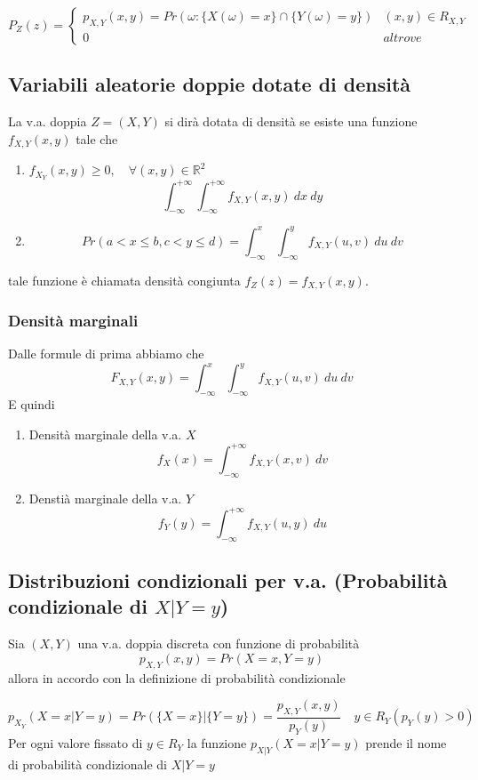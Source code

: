 \documentclass[a4paper]{report}
\begin{document}
  \[
    P_Z(z) =
    \begin{cases}
      p_{X,Y}(x,y) = Pr(\omega : \{ X(\omega) = x \} \cap \{ Y(\omega) = y \}) & (x,y) \in R_{X,Y}\\
      0 & altrove
    \end{cases}
  \]

  \subsection{Variabili aleatorie doppie dotate di densità}
  La v.a. doppia $Z= (X,Y)$ si dirà dotata di densità se esiste una funzione $f_{X,Y}(x,y)$ tale che
  \begin{enumerate}
    \item $f_{X_Y}(x,y) \geq 0, \quad \forall (x,y) \in \mathbb{R}^2$
    \[ \int_{-\infty}^{+\infty}\int_{-\infty}^{+\infty} f_{X,Y}(x,y)\: dx\: dy \]
    \item \[Pr(a < x \leq b, c < y \leq d) = \int_{-\infty}^{x}\int_{-\infty}^{y} f_{X,Y}(u,v)\: du\: dv \]

  \end{enumerate}
  tale funzione è chiamata densità congiunta $f_Z(z) = f_{X,Y}(x,y)$.

  \subsubsection{Densità marginali}
  Dalle formule di prima abbiamo che
  \[ F_{X,Y}(x,y) = \int_{-\infty}^{x}\int_{-\infty}^{y} f_{X,Y}(u,v)\: du\: dv\]
    E quindi
  \begin{enumerate}
    \item Densità marginale della v.a. $X$ \[f_X(x) = \int_{-\infty}^{+\infty} f_{X,Y}(x,v)\: dv\]
    \item Denstià marginale della v.a. $Y$ \[f_Y(y) = \int_{-\infty}^{+\infty} f_{X,Y}(u,y)\: du\]
  \end{enumerate}

  \subsection{Distribuzioni condizionali per v.a. (Probabilità condizionale di $X|Y = y$)}
  Sia $(X,Y)$ una v.a. doppia discreta con funzione di probabilità
  \[ p_{X,Y}(x,y) = Pr(X = x, Y = y) \]
    allora in accordo con la definizione di probabilità condizionale

  \[ p_{X_Y}(X=x|Y=y) = Pr(\{ X=x \}|\{ Y=y \}) = \frac{p_{X,Y}(x,y)}{p_Y(y)} \quad y \in R_Y(p_Y(y)>0) \]
  Per ogni valore fissato di $y \in R_Y$ la funzione $p_{X|Y}(X=x|Y=y)$ prende il nome di probabilità condizionale di $X|Y = y$
\end{document}
